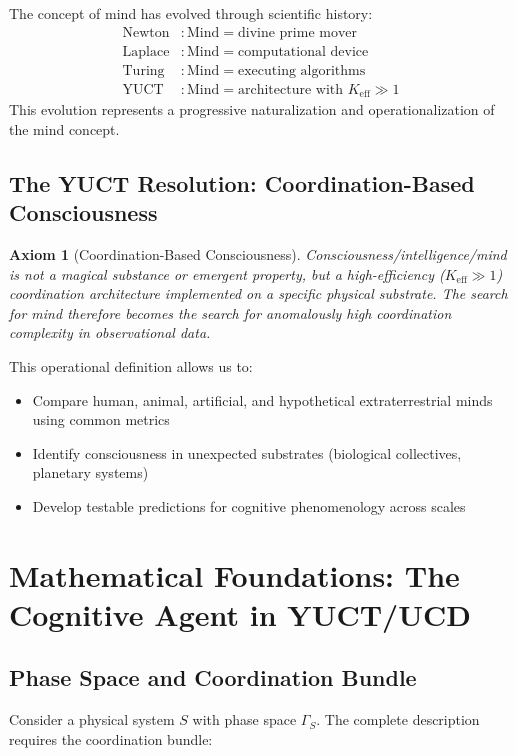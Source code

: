 \documentclass[12pt,a4paper]{article}
\newtheorem{axiom}{Axiom}
\newcommand{\eff}{\mathrm{eff}}
\newcommand{\Ke}{K_{\eff}}
\begin{document}
	The concept of mind has evolved through scientific history:
	\[
	\begin{aligned}
		\text{Newton} &: \text{Mind} = \text{divine prime mover} \\
		\text{Laplace} &: \text{Mind} = \text{computational device} \\
		\text{Turing} &: \text{Mind} = \text{executing algorithms} \\
		\text{YUCT} &: \text{Mind} = \text{architecture with } \Ke \gg 1
	\end{aligned}
	\]
	This evolution represents a progressive naturalization and operationalization of the mind concept.
	
	\subsection{The YUCT Resolution: Coordination-Based Consciousness}
	
	\begin{axiom}[Coordination-Based Consciousness]
		Consciousness/intelligence/mind is not a magical substance or emergent property, but a high-efficiency (\(\Ke \gg 1\)) coordination architecture implemented on a specific physical substrate. The search for mind therefore becomes the search for anomalously high coordination complexity in observational data.
	\end{axiom}
	
	This operational definition allows us to:
	\begin{itemize}
		\item Compare human, animal, artificial, and hypothetical extraterrestrial minds using common metrics
		\item Identify consciousness in unexpected substrates (biological collectives, planetary systems)
		\item Develop testable predictions for cognitive phenomenology across scales
	\end{itemize}
	
	\section{Mathematical Foundations: The Cognitive Agent in YUCT/UCD}
	
	\subsection{Phase Space and Coordination Bundle}
	
	Consider a physical system \(S\) with phase space \(\Gamma_S\). The complete description requires the coordination bundle:
	
\end{document}
